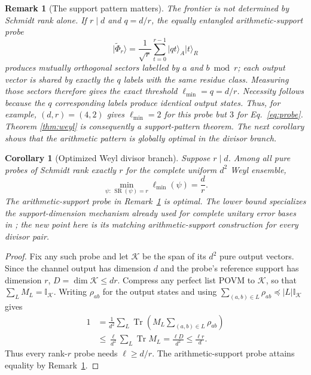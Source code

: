 \documentclass[11pt,a4paper]{article}
\newtheorem{corollary}[theorem]{Corollary}
\newtheorem{remark}[theorem]{Remark}
\newcommand{\I}{\mathbb{I}}
\newcommand{\Tr}{\operatorname{Tr}}
\newcommand{\ket}[1]{\lvert #1\rangle}
\begin{document}
\begin{remark}[The support pattern matters]\label{rem:arithmeticprobe}
The frontier is not determined by Schmidt rank alone.  If $r\mid d$ and
$q=d/r$, the equally entangled arithmetic-support probe
\[
 \ket{\widetilde\Phi_r}=\frac1{\sqrt r}
 \sum_{t=0}^{r-1}\ket{qt}_A\ket{t}_R
\]
produces mutually orthogonal sectors labelled by $a$ and $b\bmod r$; each
output vector is shared by exactly the $q$ labels with the same residue class.
Measuring those sectors therefore gives the exact threshold
$\ell_{\min}=q=d/r$.  Necessity follows because the $q$ corresponding labels
produce identical output states.  Thus, for example, $(d,r)=(4,2)$ gives
$\ell_{\min}=2$ for this probe but $3$ for Eq.~\eqref{eq:probe}.  Theorem
\ref{thm:weyl} is consequently a support-pattern theorem.  The next
corollary shows that the arithmetic pattern is globally optimal in the
divisor branch.
\end{remark}

\begin{corollary}[Optimized Weyl divisor branch]\label{cor:weylopt}
Suppose $r\mid d$.  Among all pure probes of Schmidt rank exactly $r$ for the
complete uniform $d^2$ Weyl ensemble,
\begin{equation}\label{eq:globalweyl}
  \min_{\psi:\,\operatorname{SR}(\psi)=r}\ell_{\min}(\psi)=\frac dr.
\end{equation}
The arithmetic-support probe in Remark~\ref{rem:arithmeticprobe} is optimal.
The lower bound specializes the support-dimension mechanism already used for
complete unitary error bases in \cite{ErikssonMatroidUnion2026}; the new point
here is its matching arithmetic-support construction for every divisor pair.
\end{corollary}

\begin{proof}
Fix any such probe and let $\mathcal K$ be the span of its $d^2$ pure output
vectors.  Since the channel output has dimension $d$ and the probe's reference
support has dimension $r$, $D=\dim\mathcal K\le dr$.  Compress any perfect
list POVM to $\mathcal K$, so that $\sum_LM_L=\I_{\mathcal K}$.  Writing
$\rho_{ab}$ for the output states and using
$\sum_{(a,b)\in L}\rho_{ab}\preceq |L|\I_{\mathcal K}$ gives
\begin{align*}
  1
  &=\frac1{d^2}\sum_L
    \Tr\!\left(M_L\sum_{(a,b)\in L}\rho_{ab}\right)\\
  &\le \frac{\ell}{d^2}\sum_L\Tr M_L
   =\frac{\ell D}{d^2}
  \le\frac{\ell r}{d}.
\end{align*}
Thus every rank-$r$ probe needs $\ell\ge d/r$.  The arithmetic-support probe
attains equality by Remark~\ref{rem:arithmeticprobe}.
\end{proof}
\end{document}
